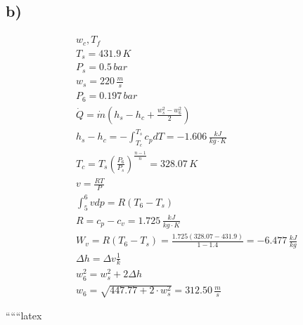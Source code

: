 

\subsection*{b)}

\begin{align*}
& w_c, T_f \\
& T_s = 431.9 \, K \\
& P_s = 0.5 \, bar \\
& w_s = 220 \, \frac{m}{s} \\
& P_6 = 0.197 \, bar \\
& \dot{Q} = \dot{m} \left( h_s - h_c + \frac{w_s^2 - w_6^2}{2} \right) \\
& h_s - h_c = - \int_{T_c}^{T_s} c_p dT = -1.606 \, \frac{kJ}{kg \cdot K} \\
& T_c = T_s \left( \frac{P_6}{P_s} \right)^{\frac{n-1}{n}} = 328.07 \, K \\
& v = \frac{RT}{P} \\
& \int_{5}^{6} v dp = R \left( T_6 - T_s \right) \\
& R = c_p - c_v = 1.725 \, \frac{kJ}{kg \cdot K} \\
& W_v = R \left( T_6 - T_s \right) = \frac{1.725 \left( 328.07 - 431.9 \right)}{1 - 1.4} = -6.477 \, \frac{kJ}{kg} \\
& \Delta h = \Delta v \frac{1}{k} \\
& w_6^2 = w_s^2 + 2 \Delta h \\
& w_6 = \sqrt{447.77 + 2 \cdot w_s^2} = 312.50 \, \frac{m}{s}
\end{align*}

``````latex